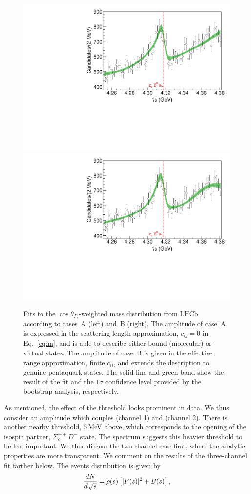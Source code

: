 \documentclass[aps,prl,
twocolumn,nofootinbib,
superscriptaddress,preprintnumbers]{revtex4-1}
\begin{document}
\begin{figure}
\centering
\includegraphics[width=.49\textwidth]{plot_nc.pdf}
\includegraphics[width=.49\textwidth]{plot_yc.pdf}
\caption{
Fits to the $\cos\theta_{P_c}$-weighted \jpsip mass distribution from LHCb~\cite{Aaij:2019vzc} according to cases~A (left) and~B (right). %
The amplitude of case~A is expressed in the scattering length approximation, \ie $c_{ij}=0$ in Eq.~\eqref{eq:m}, and is able to describe either bound (molecular) or virtual states. The amplitude of case~B is given in the effective range approximation, \ie finite $c_{ii}$, and extends the description to genuine pentaquark states.
The solid line and green 
band show the result of the fit and the $1\sigma$ 
confidence level provided by the bootstrap analysis, respectively.
} \label{fig:fits}
\end{figure}
As mentioned, the effect of the \SigmaD threshold looks prominent in data. We thus consider an amplitude which couples \jpsip (channel 1) and \SigmaD (channel 2). There is another nearby threshold, $6{\mathrm{\,Me\kern -0.1em V}}$ above, which corresponds to the opening of the isospin partner,  $\Sigma^{++}_c D^-$ state. 
The \jpsip spectrum suggests this heavier threshold to be less 
important. We thus discuss the  two-channel case first, where the analytic properties are more transparent. We comment on the results of the three-channel fit farther below.  
The events distribution is given by 
\begin{equation}
\frac{dN}{d\sqrt{s}}= \rho(s) \left[ |F(s)|^2   
 + B(s) 
\right],\label{1}
\end{equation} 
\end{document}
